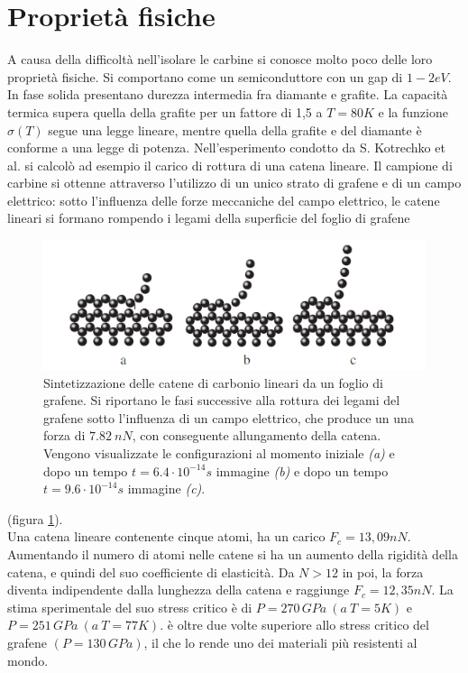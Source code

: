 \documentclass[a4paper,titlepage]{book}
\begin{document}
\section{Proprietà fisiche}
A causa della difficoltà nell'isolare le carbine si conosce molto poco delle loro proprietà fisiche.
Si comportano come un semiconduttore con un gap di $1-2 eV$. In fase solida presentano durezza intermedia fra diamante e grafite. La  capacità termica supera quella della grafite per un fattore di 1,5 a $T=80 K$ e la funzione $\sigma(T)$ segue una legge lineare, mentre quella della grafite e del diamante è conforme a una legge di potenza.
Nell'esperimento condotto da S. Kotrechko et al. \cite{Kotr}  si calcolò ad esempio il carico di rottura di una catena lineare.  
Il campione di carbine si ottenne attraverso l'utilizzo di un unico strato di grafene e di un campo elettrico: sotto l'influenza delle forze meccaniche del campo elettrico, le catene lineari si formano rompendo i legami della superficie del foglio di grafene
\begin{figure}[h!] 
\centering
 \includegraphics[width=0.8\columnwidth]{carbyne.png}
	\caption{ 	\label{cacca}
		Sintetizzazione delle catene di carbonio lineari da un foglio di grafene. Si riportano le fasi successive alla rottura dei legami del grafene sotto l'influenza di un campo elettrico, che produce un una forza di $7.82\: nN$, con conseguente allungamento della catena. Vengono visualizzate le configurazioni al momento iniziale \textit{(a)} e dopo un tempo $t=6.4\cdot10^{-14}s$  immagine \textit{(b)} e dopo un tempo $t=9.6\cdot10^{-14}s$ immagine \textit{(c)}.
	}
	\end{figure}
(figura \ref{cacca}).\\
 Una catena lineare contenente cinque atomi, ha un carico $F_c = 13,09 nN$. Aumentando il numero di atomi nelle catene si ha un aumento della rigidità della catena, e quindi del suo coefficiente di elasticità. Da $N>12$ in poi, la forza diventa indipendente dalla lunghezza della catena e raggiunge $F_c=12,35 nN$.  La stima sperimentale del suo stress critico è di $P=270 \,GPa \: (a\: T=5 K)$ e $P=251\, GPa \:(a \:T=77 K)$. è oltre due volte superiore allo stress critico del grafene $(P=130 \,GPa)$, il che lo rende uno dei materiali più resistenti al mondo.
 
\end{document}
